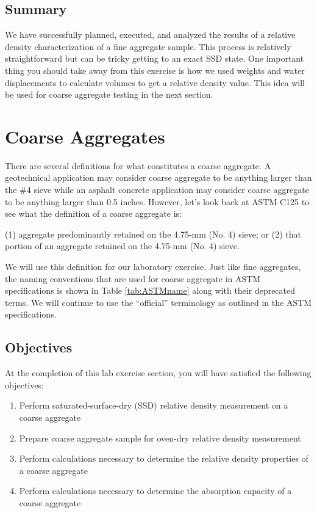 \documentclass[12pt]{article}
\begin{document}
\subsection{Summary}
We have successfully planned, executed, and analyzed the results of a relative density characterization of a fine aggregate sample. This process is relatively straightforward but can be tricky getting to an exact SSD state. One important thing you should take away from this exercise is how we used weights and water displacements to calculate volumes to get a relative density value. This idea will be used for coarse aggregate testing in the next section.

\newpage
\section{Coarse Aggregates}
\label{sec:intro}
\normalsize 
There are several definitions for what constitutes a coarse aggregate. A geotechnical application may consider coarse aggregate to be anything larger than the \#4 sieve while an asphalt concrete application may consider coarse aggregate to be anything larger than 0.5 inches. However, let's look back at ASTM C125 to see what the definition of a coarse aggregate is:

\begin{letter}
(1) aggregate predominantly retained on the 4.75-mm (No. 4) sieve; or (2) that portion of an aggregate retained on the 4.75-mm (No. 4) sieve.
\end{letter}

We will use this definition for our laboratory exercise. Just like fine aggregates, the naming conventions that are used for coarse aggregate in ASTM specifications is shown in Table \ref{tab:ASTMname} along with their deprecated terms. We will continue to use the ``official'' terminology as outlined in the ASTM specifications.


\subsection{Objectives}
\label{ssec:headingscap}
At the completion of this lab exercise section, you will have satisfied the following objectives:
\begin{enumerate}
    \item Perform saturated-surface-dry (SSD) relative density measurement on a coarse aggregate
    \item Prepare coarse aggregate sample for oven-dry relative density measurement
    \item Perform calculations necessary to determine the relative density properties of a coarse aggregate
    \item Perform calculations necessary to determine the absorption capacity of a coarse aggregate
\end{enumerate}
\end{document}
